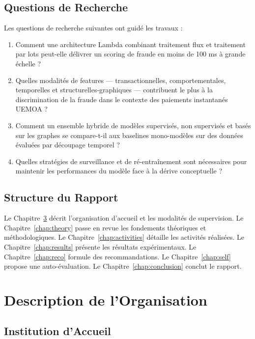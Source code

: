 \documentclass[12pt,a4paper,oneside]{book}
\theoremstyle{definition}
\theoremstyle{plain}
\begin{document}
\section{Questions de Recherche}

Les questions de recherche suivantes ont guidé les travaux :

\begin{enumerate}
  \item Comment une architecture Lambda combinant traitement flux et traitement par lots peut-elle délivrer un scoring de fraude en moins de 100 ms à grande échelle ?
  \item Quelles modalités de features — transactionnelles, comportementales, temporelles et structurelles-graphiques — contribuent le plus à la discrimination de la fraude dans le contexte des paiements instantanés UEMOA ?
  \item Comment un ensemble hybride de modèles supervisés, non supervisés et basés sur les graphes se compare-t-il aux baselines mono-modèles sur des données évaluées par découpage temporel ?
  \item Quelles stratégies de surveillance et de ré-entraînement sont nécessaires pour maintenir les performances du modèle face à la dérive conceptuelle ?
\end{enumerate}

\section{Structure du Rapport}

Le Chapitre~\ref{chap:org} décrit l'organisation d'accueil et les modalités de supervision. Le Chapitre~\ref{chap:theory} passe en revue les fondements théoriques et méthodologiques. Le Chapitre~\ref{chap:activities} détaille les activités réalisées. Le Chapitre~\ref{chap:results} présente les résultats expérimentaux. Le Chapitre~\ref{chap:reco} formule des recommandations. Le Chapitre~\ref{chap:self} propose une auto-évaluation. Le Chapitre~\ref{chap:conclusion} conclut le rapport.

\chapter{Description de l'Organisation}
\label{chap:org}

\section{Institution d'Accueil}
\end{document}
